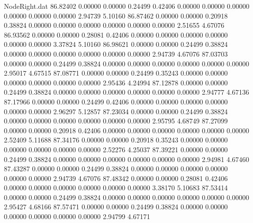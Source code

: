 \begin{filecontents}{NodeRight.dat}
  86.82402    0.00000    0.00000     0.24499    0.42406    0.00000    0.00000    0.00000    0.00000    0.00000    0.00000    2.94739    5.10160
  86.87462    0.00000    0.00000     0.20918    0.38824    0.00000    0.00000    0.00000    0.00000    0.00000    0.00000    2.51655    4.67076
  86.93562    0.00000    0.00000     0.28081    0.42406    0.00000    0.00000    0.00000    0.00000    0.00000    0.00000    3.37824    5.10160
  86.98621    0.00000    0.00000     0.24499    0.38824    0.00000    0.00000    0.00000    0.00000    0.00000    0.00000    2.94739    4.67076
  87.03703    0.00000    0.00000     0.24499    0.38824    0.00000    0.00000    0.00000    0.00000    0.00000    0.00000    2.95017    4.67515
  87.08771    0.00000    0.00000     0.24499    0.35243    0.00000    0.00000    0.00000    0.00000    0.00000    0.00000    2.95436    4.24994
  87.12878    0.00000    0.00000     0.24499    0.38824    0.00000    0.00000    0.00000    0.00000    0.00000    0.00000    2.94777    4.67136
  87.17966    0.00000    0.00000     0.24499    0.42406    0.00000    0.00000    0.00000    0.00000    0.00000    0.00000    2.96297    5.12857
  87.23034    0.00000    0.00000     0.24499    0.38824    0.00000    0.00000    0.00000    0.00000    0.00000    0.00000    2.95795    4.68749
  87.27099    0.00000    0.00000     0.20918    0.42406    0.00000    0.00000    0.00000    0.00000    0.00000    0.00000    2.52409    5.11688
  87.34176    0.00000    0.00000     0.20918    0.35243    0.00000    0.00000    0.00000    0.00000    0.00000    0.00000    2.52276    4.25037
  87.39221    0.00000    0.00000     0.24499    0.38824    0.00000    0.00000    0.00000    0.00000    0.00000    0.00000    2.94981    4.67460
  87.43287    0.00000    0.00000     0.24499    0.38824    0.00000    0.00000    0.00000    0.00000    0.00000    0.00000    2.94739    4.67076
  87.48342    0.00000    0.00000     0.28081    0.42406    0.00000    0.00000    0.00000    0.00000    0.00000    0.00000    3.38170    5.10683
  87.53414    0.00000    0.00000     0.24499    0.38824    0.00000    0.00000    0.00000    0.00000    0.00000    0.00000    2.95427    4.68166
  87.57471    0.00000    0.00000     0.24499    0.38824    0.00000    0.00000    0.00000    0.00000    0.00000    0.00000    2.94799    4.67171
\end{filecontents}
